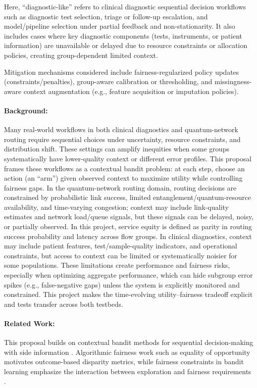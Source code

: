 \documentclass[12pt]{article}
\begin{document}
Here, ``diagnostic-like'' refers to clinical diagnostic sequential decision workflows such as diagnostic test selection, triage or follow-up escalation, and model/pipeline selection under partial feedback and non-stationarity. It also includes cases where key diagnostic components (tests, instruments, or patient information) are unavailable or delayed due to resource constraints or allocation policies, creating group-dependent limited context.

Mitigation mechanisms considered include fairness-regularized policy updates (constraints/penalties), group-aware calibration or thresholding, and missingness-aware context augmentation (e.g., feature acquisition or imputation policies).


\paragraph{Background:} \hspace{-5mm}
Many real-world workflows in both clinical diagnostics and quantum-network routing require sequential choices under uncertainty, resource constraints, and distribution shift. These settings can amplify inequities when some groups systematically have lower-quality context or different error profiles. This proposal frames these workflows as a contextual bandit problem: at each step, choose an action (an ``arm'') given observed context to maximize utility while controlling fairness gaps. In the quantum-network routing domain, routing decisions are constrained by probabilistic link success, limited entanglement/quantum-resource availability, and time-varying congestion; context may include link-quality estimates and network load/queue signals, but these signals can be delayed, noisy, or partially observed. In this project, service equity is defined as parity in routing success probability and latency across flow groups. In clinical diagnostics, context may include patient features, test/sample-quality indicators, and operational constraints, but access to context can be limited or systematically noisier for some populations. These limitations create performance and fairness risks, especially when optimizing aggregate performance, which can hide subgroup error spikes (e.g., false-negative gaps) unless the system is explicitly monitored and constrained. This project makes the time-evolving utility--fairness tradeoff explicit and tests transfer across both testbeds.


\paragraph{Related Work:} \hspace{-5mm}
This proposal builds on contextual bandit methods for sequential decision-making with side information \cite{li2010contextual,abbasi2011linear}. Algorithmic fairness work such as equality of opportunity \cite{hardt2016equality} motivates outcome-based disparity metrics, while fairness constraints in bandit learning emphasize the interaction between exploration and fairness requirements \cite{joseph2016fairness,chen2020fair}.
\end{document}
